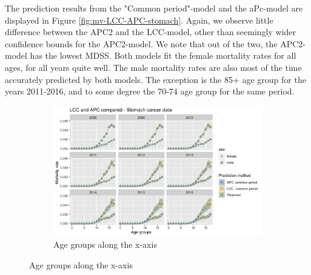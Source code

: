 \newpar The prediction results from the "Common period"-model and the aPc-model are displayed in Figure \ref{fig:mv-LCC-APC-stomach}. Again, we observe little difference between the APC2 and the LCC-model, other than seemingly wider confidence bounds for the APC2-model. We note that out of the two, the APC2-model has the lowest MDSS. Both models fit the female mortality rates for all ages, for all years quite well. The male mortality rates are also most of the time accurately predicted by both models. The exception is the 85+ age group for the years 2011-2016, and to some degree the 70-74 age group for the same period.

\begin{figure}
    \centering
    \begin{subfigure}[b]{.75\linewidth}
        \includegraphics[width=\linewidth]{real-data/real-data-multivariate/Figures/multivariate-comparison-by-age-stomach.png}
        \caption{Age groups along the x-axis}
        \label{fig:mv-LCC-APC-stomach-top}
    \end{subfigure}
    

\end{figure}

